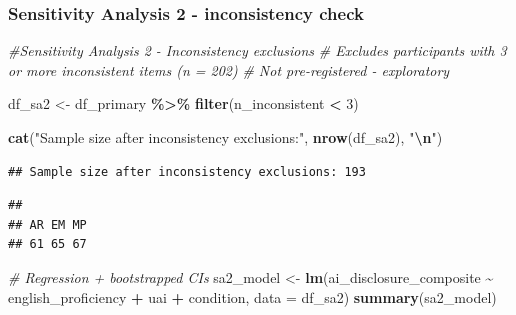 \documentclass[
]{article}
\newenvironment{Shaded}{\begin{snugshade}}{\end{snugshade}}
\newcommand{\AttributeTok}[1]{\textcolor[rgb]{0.13,0.29,0.53}{#1}}
\newcommand{\CommentTok}[1]{\textcolor[rgb]{0.56,0.35,0.01}{\textit{#1}}}
\newcommand{\DecValTok}[1]{\textcolor[rgb]{0.00,0.00,0.81}{#1}}
\newcommand{\FunctionTok}[1]{\textcolor[rgb]{0.13,0.29,0.53}{\textbf{#1}}}
\newcommand{\NormalTok}[1]{#1}
\newcommand{\OtherTok}[1]{\textcolor[rgb]{0.56,0.35,0.01}{#1}}
\newcommand{\SpecialCharTok}[1]{\textcolor[rgb]{0.81,0.36,0.00}{\textbf{#1}}}
\newcommand{\StringTok}[1]{\textcolor[rgb]{0.31,0.60,0.02}{#1}}
\begin{document}
\subsubsection{Sensitivity Analysis 2 - inconsistency
check}\label{sensitivity-analysis-2---inconsistency-check}

\begin{Shaded}
\begin{Highlighting}[]
\CommentTok{\#Sensitivity Analysis 2 {-} Inconsistency exclusions}
\CommentTok{\# Excludes participants with 3 or more inconsistent items (n = 202)}
\CommentTok{\# Not pre{-}registered {-} exploratory}

\NormalTok{df\_sa2 }\OtherTok{\textless{}{-}}\NormalTok{ df\_primary }\SpecialCharTok{\%\textgreater{}\%}
  \FunctionTok{filter}\NormalTok{(n\_inconsistent }\SpecialCharTok{\textless{}} \DecValTok{3}\NormalTok{)}

\FunctionTok{cat}\NormalTok{(}\StringTok{"Sample size after inconsistency exclusions:"}\NormalTok{, }\FunctionTok{nrow}\NormalTok{(df\_sa2), }\StringTok{"}\SpecialCharTok{\textbackslash{}n}\StringTok{"}\NormalTok{)}
\end{Highlighting}
\end{Shaded}

\begin{verbatim}
## Sample size after inconsistency exclusions: 193
\end{verbatim}

\begin{Shaded}
\end{Shaded}

\begin{verbatim}
## 
## AR EM MP 
## 61 65 67
\end{verbatim}

\begin{Shaded}
\begin{Highlighting}[]
\CommentTok{\# Regression + bootstrapped CIs}
\NormalTok{sa2\_model }\OtherTok{\textless{}{-}} \FunctionTok{lm}\NormalTok{(ai\_disclosure\_composite }\SpecialCharTok{\textasciitilde{}}\NormalTok{ english\_proficiency }\SpecialCharTok{+}\NormalTok{ uai }\SpecialCharTok{+}\NormalTok{ condition,}
                \AttributeTok{data =}\NormalTok{ df\_sa2)}
\FunctionTok{summary}\NormalTok{(sa2\_model)}
\end{Highlighting}
\end{Shaded}
\end{document}
